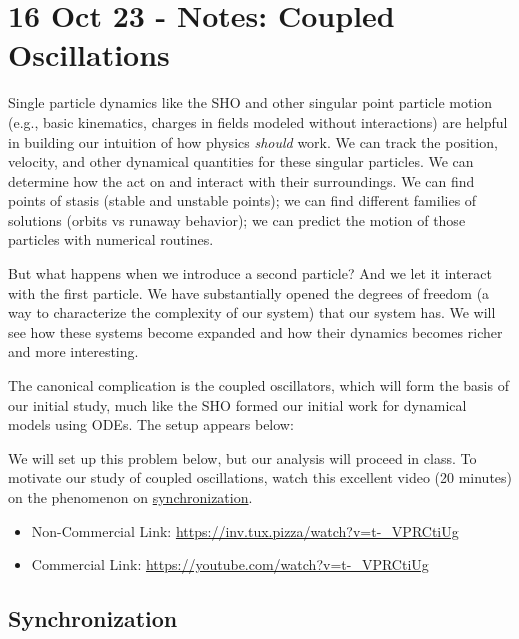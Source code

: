 \section{16 Oct 23 - Notes: Coupled
Oscillations}\label{oct-23---notes-coupled-oscillations}

Single particle dynamics like the SHO and other singular point particle
motion (e.g., basic kinematics, charges in fields modeled without
interactions) are helpful in building our intuition of how physics
\emph{should} work. We can track the position, velocity, and other
dynamical quantities for these singular particles. We can determine how
the act on and interact with their surroundings. We can find points of
stasis (stable and unstable points); we can find different families of
solutions (orbits vs runaway behavior); we can predict the motion of
those particles with numerical routines.

But what happens when we introduce a second particle? And we let it
interact with the first particle. We have substantially opened the
degrees of freedom (a way to characterize the complexity of our system)
that our system has. We will see how these systems become expanded and
how their dynamics becomes richer and more interesting.

The canonical complication is the coupled oscillators, which will form
the basis of our initial study, much like the SHO formed our initial
work for dynamical models using ODEs. The setup appears below:

We will set up this problem below, but our analysis will proceed in
class. To motivate our study of coupled oscillations, watch this
excellent video (20 minutes) on the phenomenon on
\href{https://physicstoday.scitation.org/doi/10.1063/1.1554136}{synchronization}.

\href{https://inv.tux.pizza/watch?v=t-_VPRCtiUg}{\pandocbounded{\texttt{[image: https://markdown-videos-api.jorgenkh.no/youtube/t-\_VPRCtiUg?width=720\&height=405]}}}

\begin{itemize}
\tightlist
\item
  Non-Commercial Link: \url{https://inv.tux.pizza/watch?v=t-_VPRCtiUg}
\item
  Commercial Link: \url{https://youtube.com/watch?v=t-_VPRCtiUg}
\end{itemize}

\subsection{Synchronization}\label{synchronization}


